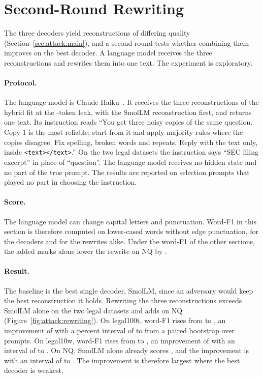 \section{Second-Round Rewriting}\label{sec:attack:rewriting}

The three decoders yield reconstructions of differing quality (Section~\ref{sec:attack:main}), and a second round tests whether combining them improves on the best decoder.
A language model receives the three reconstructions and rewrites them into one text.
The experiment is exploratory.

\paragraph{Protocol.} The language model is Claude Haiku~.
It receives the three reconstructions of the hybrid fit at the -token leak, with the SmolLM reconstruction first, and returns one text.
Its instruction reads ``You get three noisy copies of the same question. Copy 1 is the most reliable; start from it and apply majority rules where the copies disagree. Fix spelling, broken words and repeats. Reply with the text only, inside \texttt{<text></text>}.''
On the two legal datasets the instruction says ``SEC filing excerpt'' in place of ``question''.
The language model receives no hidden state and no part of the true prompt.
The results are reported on  selection prompts that played no part in choosing the instruction.

\paragraph{Score.} The language model can change capital letters and punctuation.
Word-F1 in this section is therefore computed on lower-cased words without edge punctuation, for the decoders and for the rewrites alike.
Under the word-F1 of the other sections, the added marks alone lower the rewrite on NQ by .

\paragraph{Result.} The baseline is the best single decoder, SmolLM, since an adversary would keep the best reconstruction it holds.
Rewriting the three reconstructions exceeds SmolLM alone on the two legal datasets and adds  on NQ (Figure~\ref{fig:attack:rewriting}).
On legal100t, word-F1 rises from  to , an improvement of  with a  percent interval of  to  from a paired bootstrap over prompts.
On legal10w, word-F1 rises from  to , an improvement of  with an interval of  to .
On NQ, SmolLM alone already scores , and the improvement is  with an interval of  to .
The improvement is therefore largest where the best decoder is weakest.

